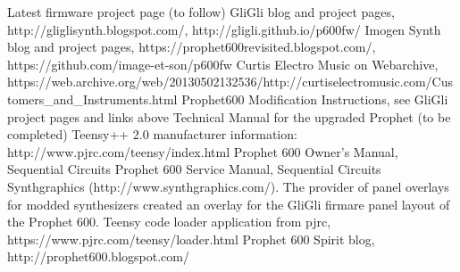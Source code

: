 \documentclass[landscape, 11pt, oneside]{report}
\makeatletter
\renewcommand\chapter{\pagestyle{myheadings}\markright{[DRAFT] User Manual for the GliGli upgraded Prophet 600}\global\@topnum\z@\@afterindentfalse\secdef\@chapter\@schapter}
\makeatother
\begin{document}
{
}

%

\begin{thebibliography}{50} 

Latest firmware project page (to follow)
GliGli blog and project pages, http://gliglisynth.blogspot.com/, http://gligli.github.io/p600fw/
Imogen Synth blog and project pages, https://prophet600revisited.blogspot.com/, https://github.com/image-et-son/p600fw
Curtis Electro Music on Webarchive, https://web.archive.org/web/20130502132536/http://curtiselectromusic.com/Customers\_and\_Instruments.html
 Prophet600 Modification Instructions, see GliGli project pages and links above
 Technical Manual for the upgraded Prophet (to be completed) 
Teensy++ 2.0 manufacturer information: http://www.pjrc.com/teensy/index.html
Prophet 600 Owner's Manual, Sequential Circuits
 Prophet 600 Service Manual, Sequential Circuits
 Synthgraphics (http://www.synthgraphics.com/). The provider of panel overlays for modded synthesizers created an overlay for the GliGli firmare panel layout of the Prophet 600.
 Teensy code loader application from pjrc, https://www.pjrc.com/teensy/loader.html
Prophet 600 Spirit blog, http://prophet600.blogspot.com/

\end{thebibliography}
\end{document}
